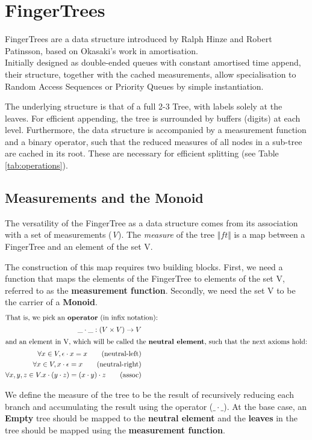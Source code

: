 \documentclass[12pt,twoside,notitlepage]{report}
\begin{document}
\section{FingerTrees} 
\label{sec:fingertrees}
	FingerTrees are a data structure introduced by Ralph Hinze and Robert Patinsson\cite{fingertrees}, based on Okasaki's work in amortisation.\\
Initially designed as double-ended queues with constant amortised time append, their structure, together with the cached measurements, allow specialisation to Random Access Sequences or Priority Queues by simple instantiation.  
 
 	The underlying structure is that of a full 2-3 Tree, with labels solely at the leaves. For efficient appending, the tree is surrounded by buffers (digits) at each level. Furthermore, the data structure is accompanied by a measurement function and a binary operator, such that the reduced measures of all nodes in a sub-tree are cached in its root. These are necessary for efficient splitting (see Table \ref{tab:operations}).

\subsection{Measurements and the Monoid}
\label{sec:measure}
The versatility of the FingerTree as a data structure comes from its association with a set of measurements (\textit{V}). The \textit{measure} of the tree $\Vert ft \Vert$ is a map between  a FingerTree and an element of the set V.

The construction of this map requires two building blocks. First, we need a function that maps the elements of the FingerTree to elements of the set V, referred to as the \textbf{measurement function}. Secondly, we need the set V to be the carrier of a \textbf{Monoid}.
\begin{align*}
\intertext{That is, we pick an \textbf{operator} (in infix notation):} 
	\_\cdot\_ : (V \times V) \to V \\ 
\intertext{and an element in V, which will be called the \textbf{neutral element}, such that the next axioms hold:} 
	\forall	x \in V, \epsilon \cdot x = x  \tag{neutral-left}\\
	\forall x \in V, x \cdot \epsilon = x  \tag{neutral-right} \\
	\forall x, y,z \in V. x \cdot (y \cdot z) = (x \cdot y) \cdot z \tag{assoc} 
\end{align*}

We define the measure of the tree to be the result of recursively reducing each branch and accumulating the result using the operator ($\_\cdot\_$). At the base case, an \textbf{Empty} tree should be mapped to the \textbf{neutral element} and the \textbf{leaves} in the tree should be mapped using the \textbf{measurement function}.
\end{document}
